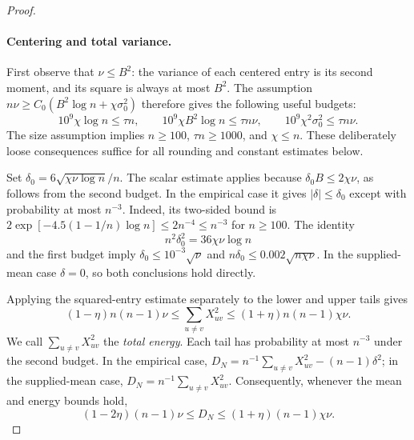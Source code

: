 \documentclass[11pt,a4paper]{article}
\theoremstyle{definition}
\theoremstyle{remark}
\begin{document}
\begin{proof}
\paragraph{Centering and total variance.}
First observe that $\nu\le B^2$: the variance of each centered
entry is its second moment, and its square is always at most $B^2$.
The assumption $n\nu\ge C_0(B^2\log n+\chi\sigma_0^2)$ therefore gives the
following useful budgets:
\begin{equation}
 10^9\chi\log n\le\tau n,\qquad
 10^9\chi B^2\log n\le\tau n\nu,\qquad
 10^9\chi^2\sigma_0^2\le\tau n\nu.
 \label{eq:membership-budgets}
\end{equation}
The size assumption implies $n\ge100$, $\tau n\ge1000$, and $\chi\le n$.
These deliberately loose consequences suffice for all rounding and
constant estimates below.

Set $\delta_0=6\sqrt{\chi\nu\log n}/n$. The scalar estimate applies
because $\delta_0 B\le2\chi\nu$, as follows from the second budget.
In the empirical case it gives $|\delta|\le\delta_0$ except with
probability at most $n^{-3}$. Indeed, its two-sided bound is
$2\exp[-4.5(1-1/n)\log n]\le2n^{-4}\le n^{-3}$ for $n\ge100$.
The identity
\[
 n^2\delta_0^2=36\chi\nu\log n
\]
and the first budget imply
$\delta_0\le10^{-3}\sqrt\nu$ and
$n\delta_0\le0.002\sqrt{n\chi\nu}$.
In the supplied-mean case $\delta=0$, so both conclusions hold directly.

Applying the squared-entry estimate separately to the lower and upper
tails gives
\[
 (1-\eta)n(n-1)\nu\le\sum_{u\ne v}X_{uv}^2
           \le(1+\eta)n(n-1)\chi\nu.
\]
We call $\sum_{u\ne v}X_{uv}^2$ the \emph{total energy}. Each tail has
probability at most $n^{-3}$ under the second budget.
In the empirical case,
$D_N=n^{-1}\sum_{u\ne v}X_{uv}^2-(n-1)\delta^2$; in the supplied-mean
case, $D_N=n^{-1}\sum_{u\ne v}X_{uv}^2$. Consequently, whenever the
mean and energy bounds hold,
\begin{equation}
 (1-2\eta)(n-1)\nu\le D_N\le(1+\eta)(n-1)\chi\nu. \label{eq:random-D}
\end{equation}


\end{proof}
\end{document}
